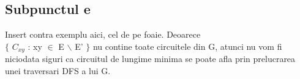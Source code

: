 \documentclass{article}
\begin{document}
\subsection*{\fontsize{16}{30}\selectfont Subpunctul e}
{\fontsize{14}{16}\selectfont
Insert contra exemplu aici, cel de pe foaie. 
Deoarece \\ $\lbrace$ $C_{xy}$ : xy $\in$ E $\backslash$ E' $\rbrace$ nu contine toate circuitele din G, atunci nu vom fi niciodata siguri ca circuitul de lungime minima se poate afla prin prelucrarea unei traversari DFS a lui G.  
}
\end{document}
